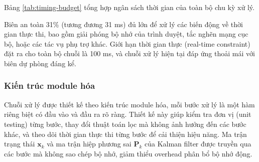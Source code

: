 Bảng \ref{tab:timing-budget} tổng hợp ngân sách thời gian của toàn bộ chu kỳ xử lý.



\begin{table}[H]
\centering
{}
\caption{Ngân sách thời gian của chuỗi xử lý trên mỗi chu kỳ 100 ms}
\label{tab:timing-budget}
\end{table}

Biên an toàn 31\% (tương đương 31 ms) đủ lớn để xử lý các biến động về thời gian thực thi, bao gồm giải phóng bộ nhớ của trình duyệt, tắc nghẽn mạng cục bộ, hoặc các tác vụ phụ trợ khác. Giới hạn thời gian thực (real-time constraint) đặt ra cho toàn bộ chuỗi là 100 ms, và chuỗi xử lý hiện tại đáp ứng thoải mái với biên dự phòng đáng kể.

\subsubsection{Kiến trúc module hóa}

\hspace{0.5cm} Chuỗi xử lý được thiết kế theo kiến trúc module hóa, mỗi bước xử lý là một hàm riêng biệt có đầu vào và đầu ra rõ ràng. Thiết kế này giúp kiểm tra đơn vị (unit testing) từng bước, thay đổi thuật toán lọc mà không ảnh hưởng đến các bước khác, và theo dõi thời gian thực thi từng bước để cải thiện hiệu năng. Ma trận trạng thái $\mathbf{x}_k$ và ma trận hiệp phương sai $\mathbf{P}_k$ của Kalman filter được truyền qua các bước mà không sao chép bộ nhớ, giảm thiểu overhead phân bổ bộ nhớ động.

